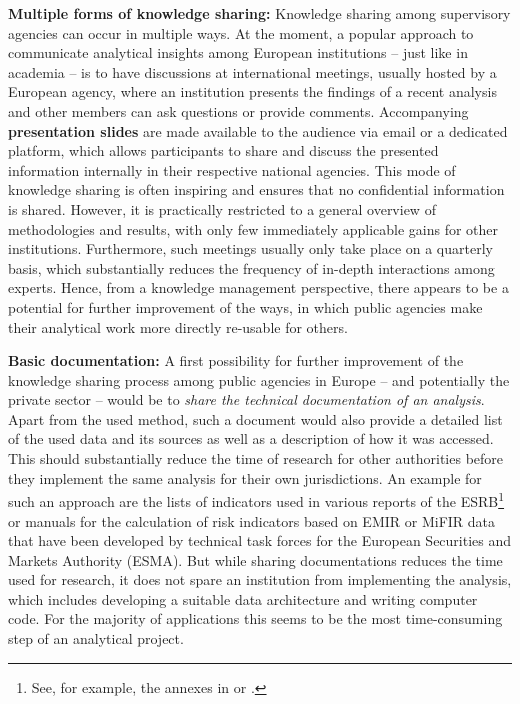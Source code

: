 \documentclass[a4paper, 11pt]{report}
\begin{document}
\textbf{Multiple forms of knowledge sharing:} Knowledge sharing among supervisory agencies can occur in multiple ways. At the moment, a popular approach to communicate analytical insights among European institutions -- just like in academia -- is to have discussions at international meetings, usually hosted by a European agency, where an institution presents the findings of a recent analysis and other members can ask questions or provide comments. Accompanying \textbf{presentation slides} are made available to the audience via email or a dedicated platform, which allows participants to share and discuss the presented information internally in their respective national agencies. This mode of knowledge sharing is often inspiring and ensures that no confidential information is shared. However, it is practically restricted to a general overview of methodologies and results, with only few immediately applicable gains for other institutions. Furthermore, such meetings usually only take place on a quarterly basis, which substantially reduces the frequency of in-depth interactions among experts. Hence, from a knowledge management perspective, there appears to be a potential for further improvement of the ways, in which public agencies make their analytical work more directly re-usable for others.

\textbf{Basic documentation:} A first possibility for further improvement of the knowledge sharing process among public agencies in Europe -- and potentially the private sector -- would be to \emph{share the technical documentation of an analysis}. Apart from the used method, such a document would also provide a detailed list of the used data and its sources as well as a description of how it was accessed. This should substantially reduce the time of research for other authorities before they implement the same analysis for their own jurisdictions. An example for such an approach are the lists of indicators used in various reports of the ESRB\footnote{See, for example, the annexes in \textcite{ESRB.2018} or \textcite{SanchezSerrano.2025}.} or manuals for the calculation of risk indicators based on EMIR or MiFIR data that have been developed by technical task forces for the European Securities and Markets Authority (ESMA). But while sharing documentations reduces the time used for research, it does not spare an institution from implementing the analysis, which includes developing a suitable data architecture and writing computer code. For the majority of applications this seems to be the most time-consuming step of an analytical project.
\end{document}

